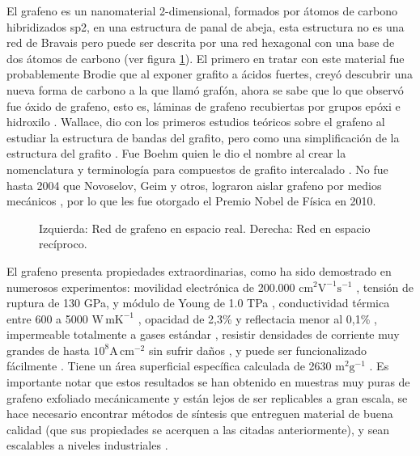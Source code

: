 El grafeno es un nanomaterial 2-dimensional, formados por átomos de carbono  hibridizados sp2, en una estructura de panal de abeja, esta estructura no es una red de Bravais pero puede ser descrita por una red hexagonal con una base de dos átomos de carbono (ver figura \ref{fig_graphene_lattice}). El primero en tratar con este material fue probablemente Brodie \citep{Brodie1859} que al exponer grafito a ácidos fuertes, creyó descubrir una nueva forma de carbono a la que llamó grafón, ahora se sabe que lo que observó fue óxido de grafeno, esto es, láminas de grafeno recubiertas por grupos epóxi e hidroxilo \citep{Geim2012}. Wallace, dio con los primeros estudios teóricos sobre el grafeno al estudiar la estructura de bandas del grafito, pero como una simplificación de la estructura del grafito \citep{Wallace1947}. Fue Boehm quien le dio el nombre al crear la nomenclatura y terminología para compuestos de grafito intercalado \citep{Boehm1986}. No fue hasta 2004 que Novoselov, Geim y otros, lograron aislar grafeno por medios mecánicos \citep{Novoselov2004}, por lo que les fue otorgado el Premio Nobel de Física en 2010.


\begin{figure}
	\centering
	\caption{Izquierda: Red de grafeno en espacio real. Derecha: Red en espacio recíproco.}
	\label{fig_graphene_lattice}
\end{figure}
El grafeno presenta propiedades extraordinarias, como ha sido demostrado en numerosos experimentos: movilidad electrónica de 200.000 $\mathrm{cm^2 V^{-1} s^{-1} }$ \citep{Bolotin2008}, tensión de ruptura de 130 GPa, y módulo de Young de 1.0 TPa \citep{Lee2008}, conductividad térmica entre 600 a 5000 $\mathrm{W\, mK^{-1}}$ \citep{Balandin2011}, opacidad de 2,3\% y reflectacia menor al 0,1\% \citep{Nair2008}, impermeable totalmente a gases estándar \citep{Bunch2007}, resistir densidades de corriente muy grandes de hasta $\mathrm{10^8 A\, cm^{-2}}$ sin sufrir daños  \citep{Moser2007}, y puede ser funcionalizado fácilmente \citep{Loh2010}. Tiene un área superficial específica calculada de 2630 $\mathrm{m^2 g^{-1}}$ \citep{Peigney2001}. Es importante notar que estos resultados se han obtenido en muestras muy puras de grafeno exfoliado mecánicamente \citep{Novoselov2004} y están lejos de ser replicables a gran escala, se hace necesario encontrar métodos de síntesis que entreguen material de buena calidad (que sus propiedades se acerquen a las citadas anteriormente), y sean escalables a niveles industriales \citep{Novoselov2012}.

